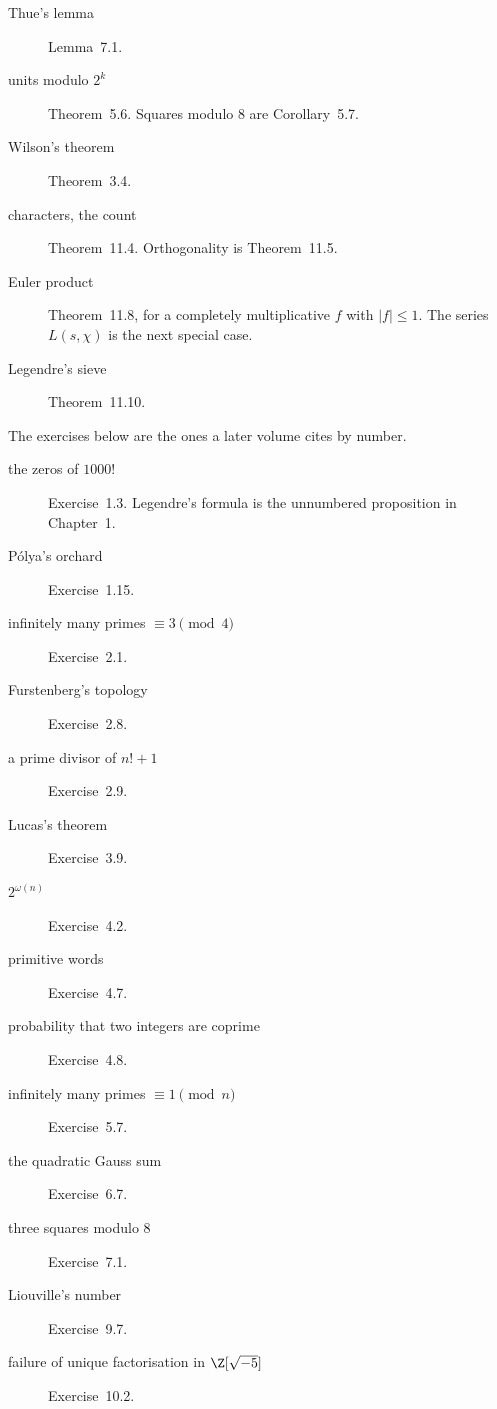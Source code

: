 \begin{description}
\item[Thue's lemma] Lemma~7.1.
\item[units modulo $2^k$] Theorem~5.6. Squares modulo $8$ are Corollary~5.7.
\item[Wilson's theorem] Theorem~3.4.
\item[characters, the count] Theorem~11.4. Orthogonality is Theorem~11.5.
\item[Euler product] Theorem~11.8, for a completely multiplicative $f$ with $|f|\le1$. The series $L(s,\chi)$ is the next special case.
\item[Legendre's sieve] Theorem~11.10.
\end{description}

\noindent The exercises below are the ones a later volume cites by number.
\begin{description}
\item[the zeros of $1000!$] Exercise~1.3. Legendre's formula is the unnumbered proposition in Chapter~1.
\item[P\'olya's orchard] Exercise~1.15.
\item[infinitely many primes $\equiv3\pmod4$] Exercise~2.1.
\item[Furstenberg's topology] Exercise~2.8.
\item[a prime divisor of $n!+1$] Exercise~2.9.
\item[Lucas's theorem] Exercise~3.9.
\item[$2^{\omega(n)}$] Exercise~4.2.
\item[primitive words] Exercise~4.7.
\item[probability that two integers are coprime] Exercise~4.8.
\item[infinitely many primes $\equiv1\pmod n$] Exercise~5.7.
\item[the quadratic Gauss sum] Exercise~6.7.
\item[three squares modulo $8$] Exercise~7.1.
\item[Liouville's number] Exercise~9.7.
\item[{failure of unique factorisation in $\Z[\sqrt{-5}]$}] Exercise~10.2.
\end{description}

